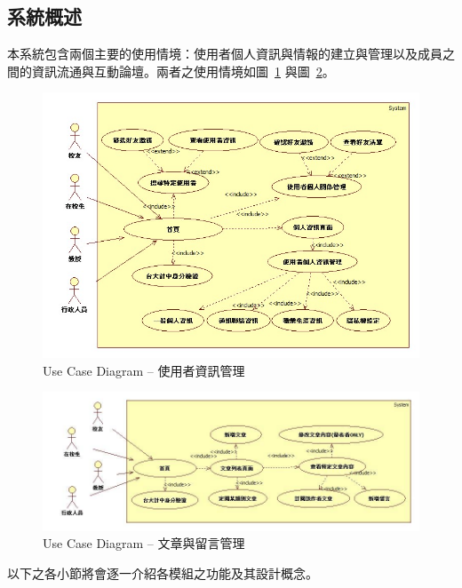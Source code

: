 \subsection{系統概述}

本系統包含兩個主要的使用情境：使用者個人資訊與情報的建立與管理以及成員之間的資訊流通與互動論壇。兩者之使用情境如圖~\ref{pic:use:userLogin} 與圖~\ref{pic:use:forum}。

\begin{figure}[H]
\centering
\includegraphics[width=.95\textwidth]{img/useseq/stage1/userProfile.jpg}
\caption{Use Case Diagram -- 使用者資訊管理}
\label{pic:use:userLogin}
\end{figure}

\begin{figure}[H]
\centering
\includegraphics[width=1.05\textwidth]{img/useseq/stage2/useForum.jpg}
\caption{Use Case Diagram -- 文章與留言管理}
\label{pic:use:forum}
\end{figure}

以下之各小節將會逐一介紹各模組之功能及其設計概念。

